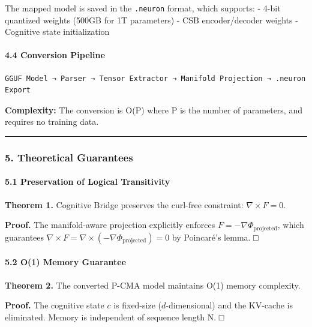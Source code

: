 \documentclass[
  11pt,
  a4paper,
]{article}
\begin{document}
The mapped model is saved in the \texttt{.neuron} format, which
supports: - 4-bit quantized weights (500GB for 1T parameters) - CSB
encoder/decoder weights - Cognitive state initialization

\paragraph{4.4 Conversion Pipeline}\label{conversion-pipeline}

\begin{verbatim}
GGUF Model → Parser → Tensor Extractor → Manifold Projection → .neuron Export
\end{verbatim}

\textbf{Complexity:} The conversion is O(P) where P is the number of
parameters, and requires no training data.

\begin{center}\rule{0.5\linewidth}{0.5pt}\end{center}

\subsubsection{5. Theoretical Guarantees}\label{theoretical-guarantees}

\paragraph{5.1 Preservation of Logical
Transitivity}\label{preservation-of-logical-transitivity}

\textbf{Theorem 1.} Cognitive Bridge preserves the curl-free constraint:
\(\nabla \times F = 0\).

\textbf{Proof.} The manifold-aware projection explicitly enforces
\(F = -\nabla\Phi_{\text{projected}}\), which guarantees
\(\nabla \times F = \nabla \times (-\nabla\Phi_{\text{projected}}) = 0\)
by Poincaré's lemma. □

\paragraph{5.2 O(1) Memory Guarantee}\label{o1-memory-guarantee}

\textbf{Theorem 2.} The converted P-CMA model maintains O(1) memory
complexity.

\textbf{Proof.} The cognitive state \(c\) is fixed-size
(\(d\)-dimensional) and the KV-cache is eliminated. Memory is
independent of sequence length N. □
\end{document}
